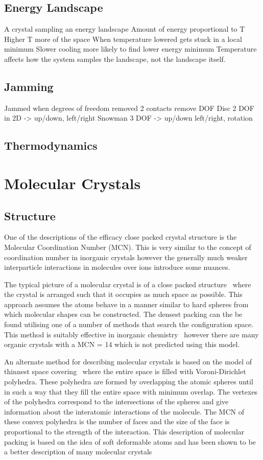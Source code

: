 \subsection{Energy Landscape}
A crystal sampling an energy landscape
Amount of energy proportional to T
Higher T more of the space
When temperature lowered gets stuck in a local minimum
Slower cooling more likely to find lower energy minimum
Temperature affects how the system samples the landscape, not the landscape itself.

\subsection{Jamming}
Jammed when degrees of freedom removed
2 contacts remove DOF
Disc 2 DOF in 2D -> up/down, left/right
Snowman 3 DOF -> up/down left/right, rotation

\subsection{Thermodynamics}


\section{Molecular Crystals}
\subsection{Structure}

One of the descriptions of the efficacy close packed crystal structure is the Molecular Coordination Number (MCN). This is very similar to the concept of coordination number in inorganic crystals however the generally much weaker interparticle interactions in molecules over ions introduce some nuances.

The typical picture of a molecular crystal is of a close packed structure~\cite{kitaigorodskii:73} where the crystal is arranged such that it occupies as much space as possible. This approach assumes the atoms behave in a manner similar to hard spheres from which molecular shapes can be constructed. The densest packing can the be found utilising one of a number of methods that search the configuration space. This method is suitably effective in inorganic chemistry~\cite{wells:84} however there are many organic crystals with a MCN = 14 which is not predicted using this model.

An alternate method for describing molecular crystals is based on the model of thinnest space covering~\cite{blatov:95} where the entire space is filled with Voroni-Dirichlet polyhedra. These polyhedra are formed by overlapping the atomic spheres until in such a way that they fill the entire space with minimum overlap. The vertexes of the polyhedra correspond to the intersections of the spheres and give information about the interatomic interactions of the molecule. The MCN of these convex polyhedra is the number of faces and the size of the face is proportional to the strength of the interaction. This description of molecular packing is based on the idea of soft deformable atoms and has been shown to be a better description of many molecular crystals~\cite{blatov:97,peresypkina:99,peresypkina:00}

